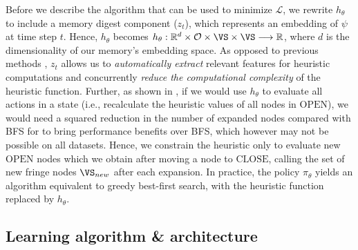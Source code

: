 Before we describe the algorithm that can be used to minimize $\mathcal{L}$, we rewrite $h_{\theta}$ to include a memory digest component ($z_t$), which represents an embedding of $\psi$ at time step $t$. Hence, $h_\theta$ becomes $h_{\theta} : \mathbb{R}^{d} \times \mathcal{O} \times \VS \times \VS \longrightarrow \mathbb{R}$, where $d$ is the dimensionality of our memory's embedding space. As opposed to previous methods \cite{bhardwaj2017learning}, $z_{t}$ allows us to \textit{automatically extract} relevant features for heuristic computations and concurrently \textit{reduce the computational complexity} of the heuristic function. Further, as shown in \cite{bhardwaj2017learning}, if we would use $h_{\theta}$ to evaluate all actions in a state (i.e., recalculate the heuristic values of all nodes in $\text{OPEN}$), we would need a squared reduction in the number of expanded nodes compared with BFS for \phil to bring performance benefits over BFS, which however may not be possible on all datasets. Hence, we constrain the heuristic only to evaluate new $\text{OPEN}$ nodes which we obtain after moving a node to $\text{CLOSE}$, calling the set of new fringe nodes $\VS_{new}$ after each expansion. In practice, the policy $\pi_{\theta}$  yields an algorithm equivalent to greedy best-first search, with the heuristic function replaced by $h_{\theta}$.


\subsection{Learning algorithm \& architecture}
\label{sec:ila}

